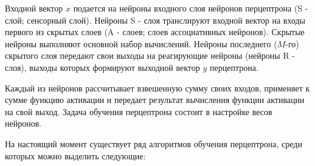 \mimageend

Входной вектор $x$ подается на нейроны входного слоя нейронов перцептрона (S - слой; сенсорный слой). Нейроны S - слоя транслируют входной вектор на входы первого из скрытых слоев (A - слоев; слоев ассоциативных нейронов). Скрытые нейроны выполняют основной набор вычислений. Нейроны последнего ($M$-го) скрытого слоя передают свои выходы на реагирующие нейроны (нейроны R - слоя), выходы которых формируют выходной вектор $y$ перцептрона.

Каждый из нейронов рассчитывает взвешенную сумму своих входов, применяет к сумме функцию активации и передает результат вычисления функции активации на свой выход. Задача обучения перцептрона состоит в настройке весов нейронов.

На настоящий момент существует ряд алгоритмов обучения перцептрона, среди которых можно выделить следующие:

